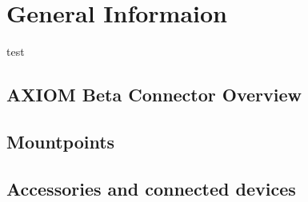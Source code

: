 \section{General Informaion}


test 


\subsection{AXIOM Beta Connector Overview}
	\subsection{Mountpoints}
	\subsection{Accessories and connected devices}
	